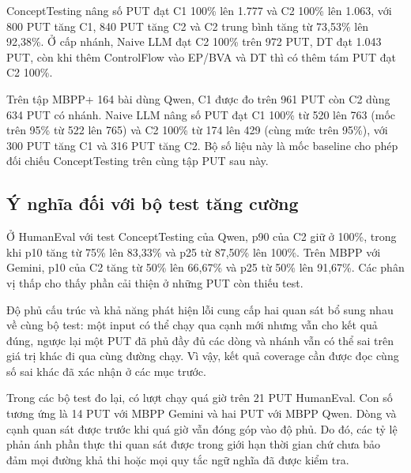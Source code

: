 ConceptTesting nâng số PUT đạt C1 100\% lên 1.777 và C2 100\% lên 1.063, với 800 PUT tăng C1, 840 PUT tăng C2 và C2 trung bình tăng từ 73,53\% lên 92,38\%. Ở cấp nhánh, Naive LLM đạt C2 100\% trên 972 PUT, DT đạt 1.043 PUT, còn khi thêm ControlFlow vào EP/BVA và DT thì có thêm tám PUT đạt C2 100\%.

Trên tập MBPP+ 164 bài dùng Qwen, C1 được đo trên 961 PUT còn C2 dùng 634 PUT có nhánh. Naive LLM nâng số PUT đạt C1 100\% từ 520 lên 763 (mốc trên 95\% từ 522 lên 765) và C2 100\% từ 174 lên 429 (cùng mức trên 95\%), với 300 PUT tăng C1 và 316 PUT tăng C2. Bộ số liệu này là mốc baseline cho phép đối chiếu ConceptTesting trên cùng tập PUT sau này.

\subsection{Ý nghĩa đối với bộ test tăng cường}

Ở HumanEval với test ConceptTesting của Qwen, p90 của C2 giữ ở 100\%, trong khi p10 tăng từ 75\% lên 83,33\% và p25 từ 87,50\% lên 100\%. Trên MBPP với Gemini, p10 của C2 tăng từ 50\% lên 66,67\% và p25 từ 50\% lên 91,67\%. Các phân vị thấp cho thấy phần cải thiện ở những PUT còn thiếu test.

Độ phủ cấu trúc và khả năng phát hiện lỗi cung cấp hai quan sát bổ sung nhau về cùng bộ test: một input có thể chạy qua cạnh mới nhưng vẫn cho kết quả đúng, ngược lại một PUT đã phủ đầy đủ các dòng và nhánh vẫn có thể sai trên giá trị khác đi qua cùng đường chạy. Vì vậy, kết quả coverage cần được đọc cùng số sai khác đã xác nhận ở các mục trước.

Trong các bộ test đo lại, có lượt chạy quá giờ trên 21 PUT HumanEval. Con số tương ứng là 14 PUT với MBPP Gemini và hai PUT với MBPP Qwen. Dòng và cạnh quan sát được trước khi quá giờ vẫn đóng góp vào độ phủ. Do đó, các tỷ lệ phản ánh phần thực thi quan sát được trong giới hạn thời gian chứ chưa bảo đảm mọi đường khả thi hoặc mọi quy tắc ngữ nghĩa đã được kiểm tra.
